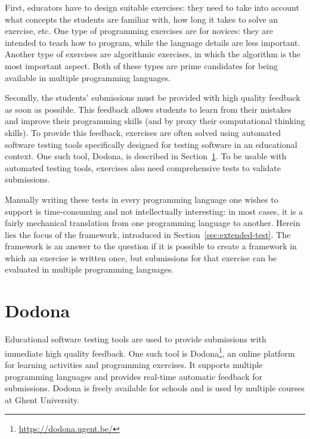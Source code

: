 \documentclass[5p,number]{elsarticle}
\begin{document}
    First, educators have to design suitable exercises: they need to take into account what concepts the students are familiar with, how long it takes to solve an exercise, etc.
    One type of programming exercises are for novices: they are intended to teach how to program, while the language details are less important.
    Another type of exercises are algorithmic exercises, in which the algorithm is the most important aspect.
    Both of these types are prime candidates for being available in multiple programming languages.
    
    Secondly, the students' submissions must be provided with high quality feedback as soon as possible.
    This feedback allows students to learn from their mistakes and improve their programming skills (and by proxy their computational thinking skills).
    To provide this feedback, exercises are often solved using automated software testing tools specifically designed for testing software in an educational context.
    One such tool, Dodona, is described in Section~\ref{sec:extended-dodona}.
    To be usable with automated testing tools, exercises also need comprehensive tests to validate submissions.
    
    Manually writing these tests in every programming language one wishes to support is time-consuming and not intellectually interesting: in most cases, it is a fairly mechanical translation from one programming language to another.
    Herein lies the focus of the \tested{} framework, introduced in Section~\ref{sec:extended-test}.
    The framework is an answer to the question if it is possible to create a framework in which an exercise is written once, but submissions for that exercise can be evaluated in multiple programming languages.

    \section{Dodona}\label{sec:extended-dodona}

    Educational software testing tools are used to provide submissions with immediate high quality feedback.
    One such tool is Dodona\footnote{\url{https://dodona.ugent.be/}}, an online platform for learning activities and programming exercises.
    It supports multiple programming languages and provides real-time automatic feedback for submissions.
    Dodona is freely available for schools and is used by multiple courses at Ghent University.
\end{document}
